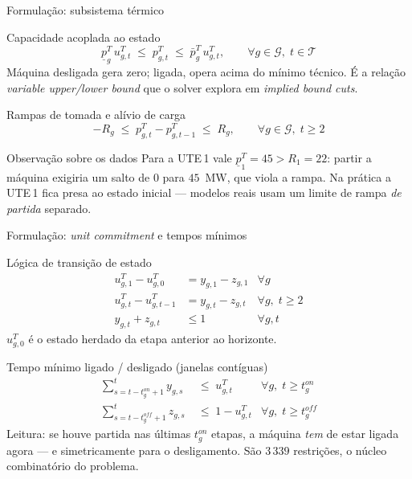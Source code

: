 \documentclass[10pt,aspectratio=169]{beamer}
\newcommand{\Gb}{\mathcal{G}}          %
\newcommand{\Tb}{\mathcal{T}}          %
\newcommand{\pT}{p^{T}}                %
\newcommand{\uT}{u^{T}}                %
\newcommand{\displaycompacto}{%
  \setlength{\abovedisplayskip}{1pt}%
  \setlength{\belowdisplayskip}{1pt}%
  \setlength{\abovedisplayshortskip}{1pt}%
  \setlength{\belowdisplayshortskip}{1pt}%
}
\begin{document}
\begin{frame}{Formulação: subsistema térmico}
  \begin{block}{Capacidade acoplada ao estado}
    \[
      \underline{p}^T_g \, \uT_{g,t} \;\le\; \pT_{g,t} \;\le\; \bar p^T_g \, \uT_{g,t},
      \qquad \forall g \in \Gb,\; t \in \Tb
    \]
    \footnotesize
    Máquina desligada gera zero; ligada, opera acima do mínimo técnico.
    É a relação \emph{variable upper/lower bound} que o solver explora em
    \emph{implied bound cuts}.
  \end{block}

  \begin{block}{Rampas de tomada e alívio de carga}
    \[
      -R_g \;\le\; \pT_{g,t} - \pT_{g,t-1} \;\le\; R_g,
      \qquad \forall g \in \Gb,\; t \ge 2
    \]
  \end{block}

  \vspace{0.3em}
  \begin{alertblock}{Observação sobre os dados}
    \footnotesize
    Para a UTE\,1 vale $\underline{p}^T_1 = 45 > R_1 = 22$: partir a máquina
    exigiria um salto de $0$ para $45$~MW, que viola a rampa. Na prática
    a UTE\,1 fica presa ao estado inicial --- modelos reais usam um limite
    de rampa \emph{de partida} separado.
  \end{alertblock}
\end{frame}

\begin{frame}{Formulação: \emph{unit commitment} e tempos mínimos}
  \small
  \displaycompacto
  \begin{block}{Lógica de transição de estado}
    \begin{align*}
      \uT_{g,1} - \uT_{g,0} &= y_{g,1} - z_{g,1}   & \forall g \\
      \uT_{g,t} - \uT_{g,t-1} &= y_{g,t} - z_{g,t} & \forall g,\; t \ge 2 \\
      y_{g,t} + z_{g,t} &\le 1                     & \forall g,t
    \end{align*}
    \footnotesize
    $\uT_{g,0}$ é o estado herdado da etapa anterior ao horizonte.
  \end{block}

  \begin{block}{Tempo mínimo ligado / desligado (janelas contíguas)}
    \begin{align*}
      \sum_{s = t - t^{on}_g + 1}^{t} y_{g,s} &\;\le\; \uT_{g,t}
        & \forall g,\; t \ge t^{on}_g \\[2pt]
      \sum_{s = t - t^{off}_g + 1}^{t} z_{g,s} &\;\le\; 1 - \uT_{g,t}
        & \forall g,\; t \ge t^{off}_g
    \end{align*}
    \footnotesize
    Leitura: se houve partida nas últimas $t^{on}_g$ etapas, a máquina
    \emph{tem} de estar ligada agora --- e simetricamente para o desligamento.
    São $3\,339$ restrições, o núcleo combinatório do problema.
  \end{block}
\end{frame}
\end{document}
